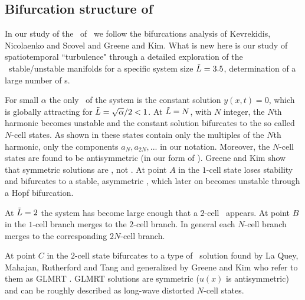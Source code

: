 %

\subsection{Bifurcation structure of \KS}
\label{sec:KSlit}


In our study of the \eqva\ of
\KSe\ we follow the bifurcations analysis of
Kevrekidis, Nicolaenko and Scovel 
and
Greene and Kim. What is new here is
our study of spatiotemporal ``turbulence" through
a detailed exploration of the \eqva\ stable/unstable manifolds
for a specific system size $\tilde{L} = 3.5$, determination
of a large number of \rpo s.

For small $\alpha$ the only \eqv\ of the system is the constant solution $y(x,t)=0$,
which is globally attracting 
for $\tilde{L}=\sqrt{\alpha}/2<1$. At $\tilde{L}=N$, with $N$ integer, 
the $N$th harmonic becomes unstable and the constant solution
bifurcates to the so called $N$-cell states. 
As shown in  these states contain only the multiples of the $N$th
harmonic, {\ie} only the components $a_N,a_{2N},...$ in our notation.
Moreover, the $N$-cell states are found to be antisymmetric (in our form of \KSe).
Greene and Kim show that symmetric solutions are \eqva, not \reqva. 
At point $A$ in 
the $1$-cell state loses stability
and bifurcates to a stable, 
asymmetric \reqv, which later on becomes unstable through a Hopf bifurcation. 

At $\tilde{L}=2$ the system has become large enough 
that a $2$-cell \eqv\ appears. 
At point $B$ in 
the $1$-cell branch merges to the $2$-cell branch. 
In general each $N$-cell branch merges to the corresponding $2N$-cell branch.

At point $C$ in 
the $2$-cell state bifurcates to a type of 
\eqv\ solution
found by La Quey, Mahajan, Rutherford and Tang and generalized by Greene and Kim who refer to them as GLMRT \eqva. GLMRT solutions are symmetric 
($u(x)$ is antisymmetric)
and can be roughly described as long-wave distorted $N$-cell states.

